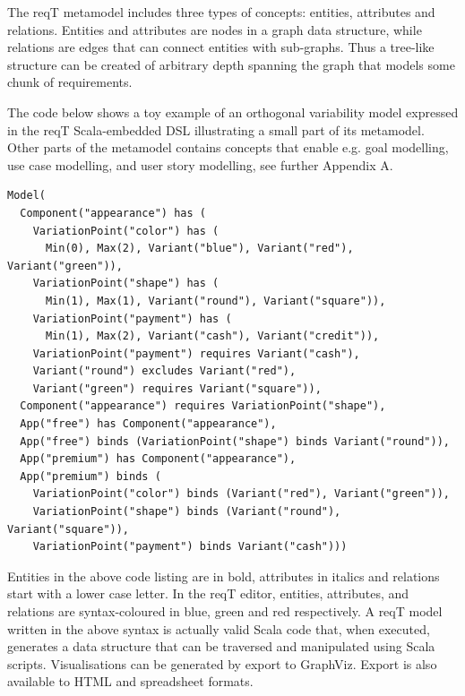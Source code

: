 \documentclass[a4paper]{llncs}
\begin{document}
The reqT metamodel includes three types of concepts: entities, attributes and relations. Entities and attributes are nodes in a graph data structure, while relations are edges that can connect entities with sub-graphs. Thus a tree-like structure can be created of arbitrary depth spanning the graph that models some chunk of requirements. 

The code below shows a toy example of an orthogonal variability model \cite{metzger2007variability} expressed in the reqT Scala-embedded DSL \cite{Regnell2013} illustrating a small part of its metamodel. Other parts of the metamodel contains concepts that enable e.g. goal modelling, %
use case modelling, and user story modelling, see further Appendix A.

\begin{spacing}{1.1}
\begin{lstlisting}
Model(
  Component("appearance") has (
    VariationPoint("color") has (
      Min(0), Max(2), Variant("blue"), Variant("red"), Variant("green")),
    VariationPoint("shape") has (
      Min(1), Max(1), Variant("round"), Variant("square")),
    VariationPoint("payment") has (
      Min(1), Max(2), Variant("cash"), Variant("credit")),
    VariationPoint("payment") requires Variant("cash"), 
    Variant("round") excludes Variant("red"),
    Variant("green") requires Variant("square")),
  Component("appearance") requires VariationPoint("shape"), 
  App("free") has Component("appearance"),  
  App("free") binds (VariationPoint("shape") binds Variant("round")),
  App("premium") has Component("appearance"),  
  App("premium") binds ( 
    VariationPoint("color") binds (Variant("red"), Variant("green")),
    VariationPoint("shape") binds (Variant("round"), Variant("square")),
    VariationPoint("payment") binds Variant("cash")))
\end{lstlisting}
\end{spacing}
\noindent Entities in the above code listing are in bold, attributes in italics and relations start with a lower case letter. In the reqT editor, entities, attributes, and relations are syntax-coloured in blue, green and red respectively. A reqT model written in the above syntax is actually valid Scala code that, when executed, generates a data structure that can be traversed and manipulated using Scala scripts. Visualisations can be generated by export to GraphViz. Export is also available to HTML and spreadsheet formats. 
\end{document}
